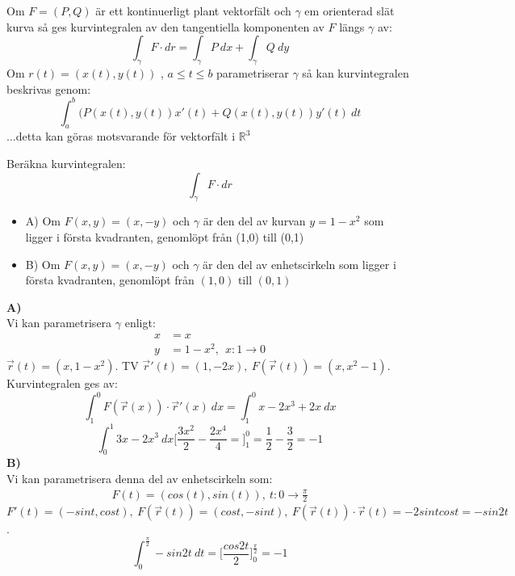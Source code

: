\documentclass{report}
\begin{document}
{
Om $ F = (P,Q) $ är ett kontinuerligt plant vektorfält och $ \gamma $ em orienterad slät kurva så ges kurvintegralen av den tangentiella komponenten av $ F $ längs $ \gamma $ av:
\begin{equation*}
\int_{ \gamma}^{} F \cdot  dr = \int_{ \gamma}^{} P \: dx + \int_{ \gamma}^{} Q \: dy   
\end{equation*}
Om $ r(t) = (x(t), y(t)) $ , $ a \le t \le b $ parametriserar $ \gamma $ så kan kurvintegralen beskrivas genom:
\begin{equation*}
\int_{a}^{b} (P(x(t),y(t))x'(t) + Q(x(t),y(t))y'(t) \: dt 
\end{equation*}
...detta kan göras motsvarande för vektorfält i $ \mathbb{R}^3 $ 
}

\pagebreak
{}
{
Beräkna kurvintegralen:
\begin{equation*}
\int_{ \gamma}^{} F \cdot  dr
\end{equation*}
\begin{itemize}
	\item A) Om $ F(x,y) = (x,-y) $ och $ \gamma $ är den del av kurvan $ y = 1 -x^2 $ som ligger i första kvadranten, genomlöpt från (1,0) till (0,1)
	\item B) Om $ F(x,y) = (x,-y) $ och $ \gamma $ är den del av enhetscirkeln som ligger i första kvadranten, genomlöpt från $ (1,0) $ till $ (0,1) $
\end{itemize}

\textbf{A)}\\
Vi kan parametrisera $ \gamma $ enligt:
\begin{align*}
	x &= x\\
	y &= 1 -x^2,\:\: x : 1 \to 0
\end{align*}
$ \vec{r} (t) = (x,1-x^2) $. TV $ \vec{r} '(t) = (1,-2x), \: F( \vec{r} (t))  = (x,x^2-1) $. Kurvintegralen ges av:
\begin{equation*}
\int_{1}^{0} F( \vec{r} (x)) \cdot \vec{r} '(x) \: dx = \int_{1}^{0} x - 2x^3+2x \: dx  
\end{equation*}
\begin{equation*}
	\int_{0}^{1} 3x-2x^3 \: dx \bigl[ \frac{3x^2}{2} - \frac{2x^4}{4}  =  \bigr]_{1}^{0} = \frac{1}{2} - \frac{3}{2} = -1
\end{equation*}
\textbf{B)} \\
Vi kan parametrisera denna del av enhetscirkeln som:
\begin{align*}
F(t) = (cos(t), sin(t)), \: t : 0 \to \frac{\pi}{2} 
\end{align*}
$ F'(t) = (-sint, cost), \: F( \vec{r} (t)) = (cost, -sint), \: F( \vec{r}(t)) \cdot \vec{r} (t) = -2sintcost = -sin2t  $.
\begin{equation*}
	\int_{0}^{ \frac{\pi}{2} } - sin2t \: dt = \bigl[ \frac{cos2t}{2}   \bigr]_{0}^{ \frac{\pi}{2}  } = -1
\end{equation*}

}
\end{document}
